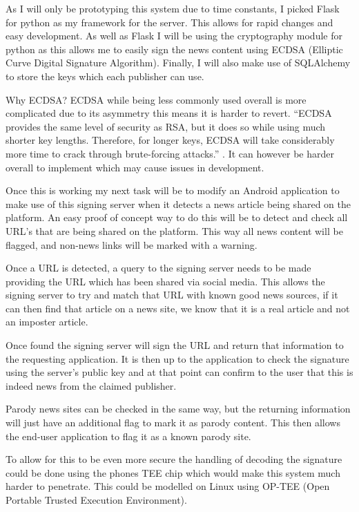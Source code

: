 \documentclass[a4paper, 11pt]{article}
\begin{document}
As I will only be prototyping this system due to time constants, I picked Flask for python as my framework for the server. This allows for rapid changes and easy development. As well as Flask I will be using the cryptography module for python as this allows me to easily sign the news content using ECDSA (Elliptic Curve Digital Signature Algorithm). Finally, I will also make use of SQLAlchemy to store the keys which each publisher can use.

Why ECDSA? ECDSA while being less commonly used overall is more complicated due to its asymmetry this means it is harder to revert. “ECDSA provides the same level of security as RSA, but it does so while using much shorter key lengths. Therefore, for longer keys, ECDSA will take considerably more time to crack through brute-forcing attacks.” \cite{RSA}. It can however be harder overall to implement which may cause issues in development.

Once this is working my next task will be to modify an Android application to make use of this signing server when it detects a news article being shared on the platform. An easy proof of concept way to do this will be to detect and check all URL’s that are being shared on the platform. This way all news content will be flagged, and non-news links will be marked with a warning.

Once a URL is detected, a query to the signing server needs to be made providing the URL which has been shared via social media. This allows the signing server to try and match that URL with known good news sources, if it can then find that article on a news site, we know that it is a real article and not an imposter article. 

Once found the signing server will sign the URL and return that information to the requesting application. It is then up to the application to check the signature using the server’s public key and at that point can confirm to the user that this is indeed news from the claimed publisher.

Parody news sites can be checked in the same way, but the returning information will just have an additional flag to mark it as parody content. This then allows the end-user application to flag it as a known parody site.

To allow for this to be even more secure the handling of decoding the signature could be done using the phones TEE chip which would make this system much harder to penetrate. This could be modelled on Linux using OP-TEE (Open Portable Trusted Execution Environment).
\end{document}
